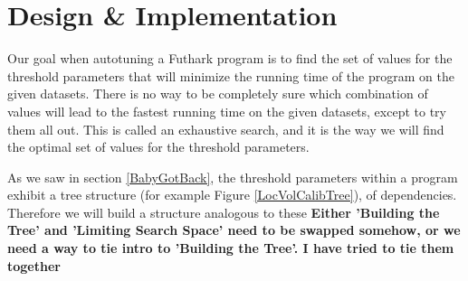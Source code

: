 \section{Design \& Implementation}

Our goal when autotuning a Futhark program is to find the set of values for the
threshold parameters that will minimize the running time of the program on the
given datasets. There is no way to be completely sure
which combination of values will lead to the fastest running time on the given
datasets, except to try them all out. This is called an exhaustive search, and
it is the way we will find the optimal set of values for the threshold
parameters. 

As we saw in section \ref{BabyGotBack}, the threshold parameters within a program exhibit a tree structure (for example Figure \ref{LocVolCalibTree}), of dependencies. Therefore we will build a structure analogous to these 
\textbf{Either 'Building the Tree' and 'Limiting Search Space' need to be
swapped somehow, or we need a way to tie intro to 'Building the Tree'. I have tried to tie them together}

